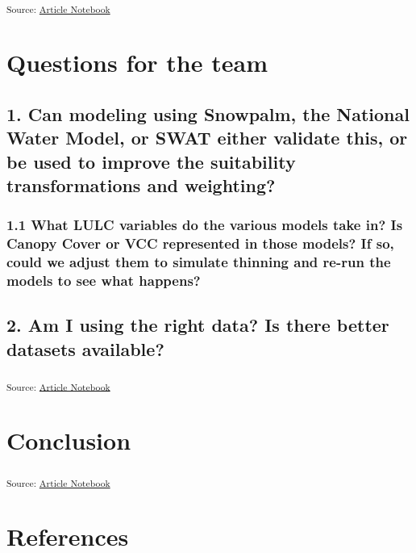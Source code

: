 \documentclass[
]{agujournal2019}
\begin{document}
\textsubscript{Source:
\href{https://Ryan3Lima.github.io/ATUR-ForestThinning/index.ipynb.html}{Article
Notebook}}

\section{Questions for the team}\label{questions-for-the-team}

\subsection{1. Can modeling using Snowpalm, the National Water Model, or
SWAT either validate this, or be used to improve the suitability
transformations and
weighting?}\label{can-modeling-using-snowpalm-the-national-water-model-or-swat-either-validate-this-or-be-used-to-improve-the-suitability-transformations-and-weighting}

\subsubsection{1.1 What LULC variables do the various models take in? Is
Canopy Cover or VCC represented in those models? If so, could we adjust
them to simulate thinning and re-run the models to see what
happens?}\label{what-lulc-variables-do-the-various-models-take-in-is-canopy-cover-or-vcc-represented-in-those-models-if-so-could-we-adjust-them-to-simulate-thinning-and-re-run-the-models-to-see-what-happens}

\subsection{2. Am I using the right data? Is there better datasets
available?}\label{am-i-using-the-right-data-is-there-better-datasets-available}

\textsubscript{Source:
\href{https://Ryan3Lima.github.io/ATUR-ForestThinning/index.ipynb.html}{Article
Notebook}}

\section{Conclusion}\label{conclusion}

\textsubscript{Source:
\href{https://Ryan3Lima.github.io/ATUR-ForestThinning/index.ipynb.html}{Article
Notebook}}

\section*{References}\label{references}
\end{document}
